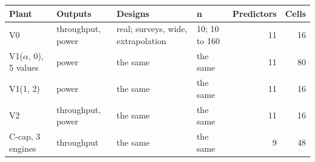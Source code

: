\begin{tabular}{@{}llllrr@{}}
\toprule
Plant & Outputs & Designs & n & Predictors & Cells \\
\midrule
V0 & throughput, power & real; surveys, wide, extrapolation & 10; 10 to 160 & 11 & 16 \\
V1($\alpha$, 0), 5 values & power & the same & the same & 11 & 80 \\
V1(1, 2) & power & the same & the same & 11 & 16 \\
V2 & throughput, power & the same & the same & 11 & 16 \\
C-cap, 3 engines & throughput & the same & the same & 9 & 48 \\
\bottomrule
\end{tabular}
